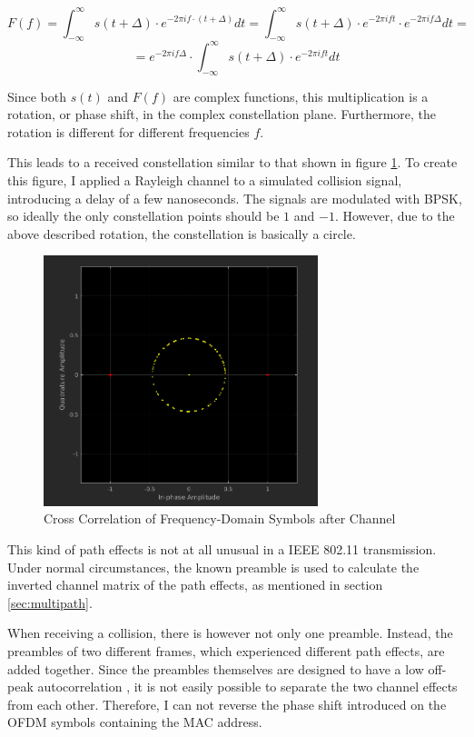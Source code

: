 $$ F(f) = \int_{-\infty}^{\infty} s(t + \Delta) \cdot e^{-2 \pi i f \cdot (t + \Delta)} dt = \int_{-\infty}^{\infty} s(t + \Delta) \cdot e^{-2 \pi i f t} \cdot e^{-2 \pi i f \Delta} dt = $$
$$ = e^{-2 \pi i f \Delta} \cdot \int_{-\infty}^{\infty} s(t + \Delta) \cdot e^{-2 \pi i f t} dt $$\vspace{0cm}

Since both $ s(t) $ and $ F(f) $ are complex functions, this multiplication is a rotation, or phase shift, in the complex constellation plane. Furthermore, the rotation is different for different frequencies $ f $.

This leads to a received constellation similar to that shown in figure \ref{fig:freqd-corr}. To create this figure, I applied a Rayleigh channel \cite{NEEDED} to a simulated collision signal, introducing a delay of a few nanoseconds. The signals are modulated with BPSK, so ideally the only constellation points should be $ 1 $ and $ -1 $. However, due to the above described rotation, the constellation is basically a circle.

\begin{figure}[ht]
	\centering
	\includegraphics[width=8cm]{gfx/images/freqd-correlation}
	\caption{Cross Correlation of Frequency-Domain Symbols after Channel}
	\label{fig:freqd-corr}
\end{figure}

This kind of path effects is not at all unusual in a IEEE 802.11 transmission. Under normal circumstances, the known preamble is used to calculate the inverted channel matrix of the path effects, as mentioned in section \ref{sec:multipath}.

When receiving a collision, there is however not only one preamble. Instead, the preambles of two different frames, which experienced different path effects, are added together. Since the preambles themselves are designed to have a low off-peak autocorrelation \cite{NEEDED}, it is not easily possible to separate the two channel effects from each other. Therefore, I can not reverse the phase shift introduced on the OFDM symbols containing the MAC address.

